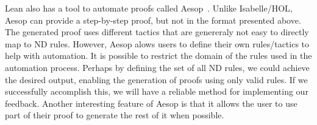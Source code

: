 Lean also has a tool to automate proofs called Aesop~\cite{leanprovercommunity_2021_github}. Unlike Isabelle/HOL, Aesop can provide a step-by-step proof, but not in the format presented above. The generated proof uses different tactics that are genereraly not easy to directly map to \gls{ND} rules. However, Aesop alows users to define their own rules/tactics to help with automation. It is possible to restrict the domain of the rules used in the automation process. Perhaps by defining the set of all \gls{ND} rules, we could achieve the desired output, enabling the generation of proofs using only valid rules. If we successfully accomplish this, we will have a reliable method for implementing our feedback. Another interesting feature of Aesop is that it allows the user to use part of their proof to generate the rest of it when possible.




